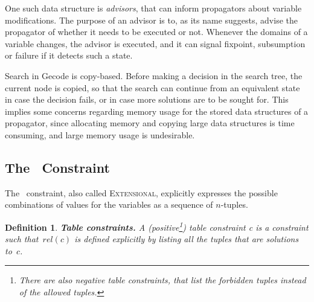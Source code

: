 \documentclass[a4paper,11pt]{article}
\newtheorem{definition}{Definition}
\newcommand{\Table}{\Constraint{Table}}
\newcommand{\Extensional}{\Constraint{Extensional}~}
\def\Extensional{\textsc{Extensional}}
\numberwithin{equation}{section}
\begin{document}



One such data structure is \emph{advisors}, that can inform propagators about variable
modifications.
The purpose of an advisor is to, as its name suggests, advise
the propagator of whether it needs to be executed or not. 
Whenever the domains of a variable changes, the advisor is executed,
and it can signal fixpoint, subsumption or failure if it detects
such a state.

Search in Gecode is copy-based. Before making a decision in the search tree, the
current node is copied, so that the search can continue from an equivalent 
state in case the decision fails, or in case more solutions are to be sought for.
This implies some concerns regarding memory usage for the stored data structures
of a propagator, since allocating memory and copying large data structures
is time consuming, and large memory usage is undesirable.




\subsection{The \Table~Constraint}
\label{bg:table}
The \Table~constraint, also called \Extensional,
explicitly expresses the possible combinations of values for the variables as a
sequence of $n$-tuples.

\begin{definition}
  \textbf{Table constraints.} A
  (positive\footnote{There are also negative table constraints, that list the forbidden tuples instead of the allowed tuples.})
  \emph{table constraint c} is a
  constraint such that~$rel(c)$ is defined explicitly by listing all the
  tuples that are solutions to~$c$.
\end{definition}
\end{document}
